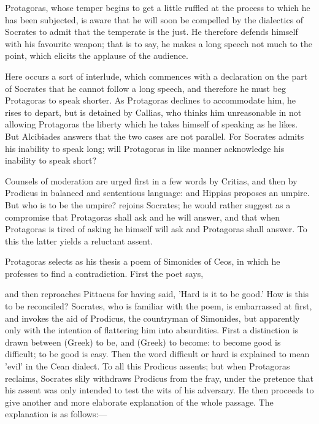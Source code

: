 \documentclass[11pt,letter]{article}
\begin{document}
\par  Protagoras, whose temper begins to get a little ruffled at the process to which he has been subjected, is aware that he will soon be compelled by the dialectics of Socrates to admit that the temperate is the just. He therefore defends himself with his favourite weapon; that is to say, he makes a long speech not much to the point, which elicits the applause of the audience.

\par  Here occurs a sort of interlude, which commences with a declaration on the part of Socrates that he cannot follow a long speech, and therefore he must beg Protagoras to speak shorter. As Protagoras declines to accommodate him, he rises to depart, but is detained by Callias, who thinks him unreasonable in not allowing Protagoras the liberty which he takes himself of speaking as he likes. But Alcibiades answers that the two cases are not parallel. For Socrates admits his inability to speak long; will Protagoras in like manner acknowledge his inability to speak short?

\par  Counsels of moderation are urged first in a few words by Critias, and then by Prodicus in balanced and sententious language: and Hippias proposes an umpire. But who is to be the umpire? rejoins Socrates; he would rather suggest as a compromise that Protagoras shall ask and he will answer, and that when Protagoras is tired of asking he himself will ask and Protagoras shall answer. To this the latter yields a reluctant assent.

\par  Protagoras selects as his thesis a poem of Simonides of Ceos, in which he professes to find a contradiction. First the poet says,
 
\par  and then reproaches Pittacus for having said, 'Hard is it to be good.' How is this to be reconciled? Socrates, who is familiar with the poem, is embarrassed at first, and invokes the aid of Prodicus, the countryman of Simonides, but apparently only with the intention of flattering him into absurdities. First a distinction is drawn between (Greek) to be, and (Greek) to become: to become good is difficult; to be good is easy. Then the word difficult or hard is explained to mean 'evil' in the Cean dialect. To all this Prodicus assents; but when Protagoras reclaims, Socrates slily withdraws Prodicus from the fray, under the pretence that his assent was only intended to test the wits of his adversary. He then proceeds to give another and more elaborate explanation of the whole passage. The explanation is as follows:—
\end{document}
